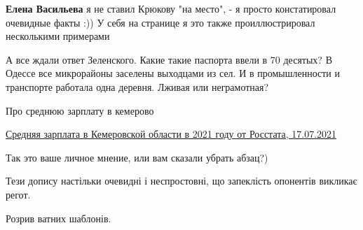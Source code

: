 \begin{itemize}
\begin{itemize}
\textbf{Елена Васильева} я не ставил Крюкову "на место", - я просто констатировал очевидные факты :))
У себя на странице я это также проиллюстрировал несколькими примерами
\end{itemize}

 

А все ждали ответ Зеленского. Какие такие паспорта ввели в 70 десятых? В Одессе
все микрорайоны заселены выходцами из сел. И в промышленности и транспорте
работала одна деревня. Лживая или неграмотная?

 
Про среднюю зарплату в кемерово

\href{https://gogov.ru/average-salary/kmr#:~:text=Средняя%20заработная%20плата%20в%20Кемеровской,%2C%202021%20-%2043%20345%20руб|}{%
Средняя зарплата в Кемеровской области в 2021 году от Росстата, 17.07.2021%
}


 
Так это ваше личное мнение, или вам сказали убрать абзац?)

 

Тези допису настільки очевидні і неспростовні, що запеклість опонентів викликає регот.

Розрив ватних шаблонів.

 


\end{itemize}
